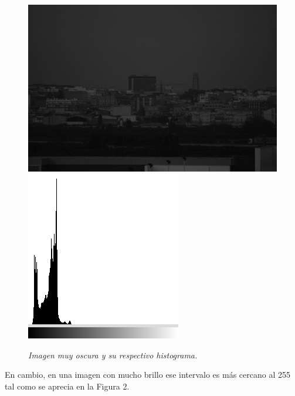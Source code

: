 \documentclass[conference]{IEEEtran}
\begin{document}
\begin{figure}[h]
	\begin{center}
		\setlength{\unitlength}{0.00105in}
		\includegraphics[scale=0.27]{./images/city.jpg}
		\includegraphics[scale=0.377]{./images/figure1_1.png}
	\end{center}
	\caption{\emph{ Imagen muy oscura y su respectivo histograma.}}
\end{figure}
En cambio, en una imagen con mucho brillo ese intervalo es m\'as cercano al 255 tal como se aprecia en la Figura 2.\\
\end{document}
